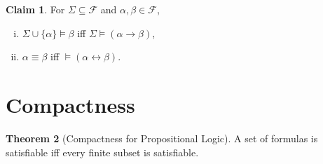 \documentclass[12pt]{article}
\theoremstyle{definition}
\newtheorem{theorem}{Theorem}[section]
\newtheorem{claim}[theorem]{Claim}
\newcommand{\<}{\langle}
\renewcommand{\>}{\rangle}
\newcommand{\seq}{\subseteq}
\newcommand{\FF}{\mathcal{F}}
\newcommand{\liff}{\leftrightarrow}
\begin{document}
\begin{claim}
    For $\Sigma \seq \FF$ and $\alpha, \beta \in \FF$,
    \begin{enumerate}[(i)]
        \item $\Sigma \cup \{\alpha\} \vDash \beta$ iff $\Sigma \vDash (\alpha \to \beta)$,
        \item $\alpha \equiv \beta$ iff $\vDash (\alpha \liff \beta)$.
    \end{enumerate}
\end{claim}

\section{Compactness}

\begin{theorem}[Compactness for Propositional Logic]\label{thm:prop-compact}
    A set of formulas is satisfiable iff every finite subset is satisfiable.
\end{theorem}
\end{document}
